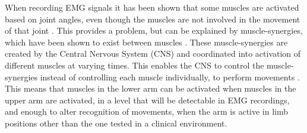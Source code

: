 When recording EMG signals it has been shown that some muscles are activated based on joint angles, even though the muscles are not involved in the movement of that joint \cite{Fougner2011}. This provides a problem, but can be explained by muscle-synergies, which have been shown to exist between muscles \cite{DeRugy2013}. These muscle-synergies are created by the Central Nervous System (CNS) and coordinated into activation of different muscles at varying times. This enables the CNS to control the muscle-synergies instead of controlling each muscle individually, to perform movements \cite{jiang2009}. This means that muscles in the lower arm can be activated when muscles in the upper arm are activated, in a level that will be detectable in EMG recordings, and enough to alter recognition of movements, when the arm is active in limb positions other than the one tested in a clinical environment. 

